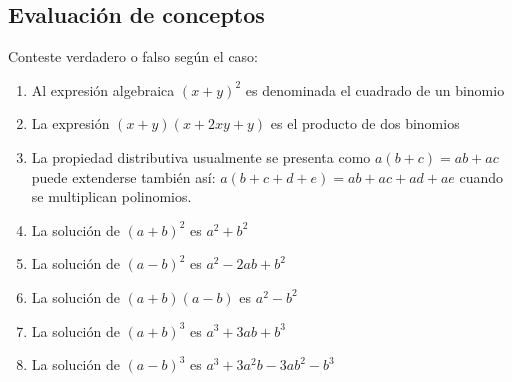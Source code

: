 \documentclass[10pt,twoside]{article}
\begin{document}
\subsection*{Evaluaci\'{o}n de conceptos}
Conteste verdadero o falso seg\'{u}n el caso:
\begin{enumerate}
\item Al expresi\'{o}n algebraica $(x+y)^{2}$ es denominada el cuadrado de un binomio
\item La expresi\'{o}n $(x+y)(x+2xy+y)$ es el producto de dos binomios
\item La propiedad distributiva usualmente se presenta como $a(b+c)=ab+ac$ puede extenderse también así: $a(b+c+d+e)=ab+ac+ad+ae$ cuando se multiplican polinomios.
\item La solución de $(a+b)^2$ es $a^2+b^2$
\item La solución de $(a-b)^2$ es $a^2-2ab+b^2$
\item La soluci\'{o}n de $(a+b)(a-b)$ es $a^{2}-b^{2}$
\item La soluci\'{o}n de $(a+b)^{3}$ es $a^{3}+3ab+b^{3}$
\item La soluci\'{o}n de $(a-b)^{3}$ es $a^{3}+3a^{2}b-3ab^{2}-b^{3}$
\end{enumerate}
\end{document}
